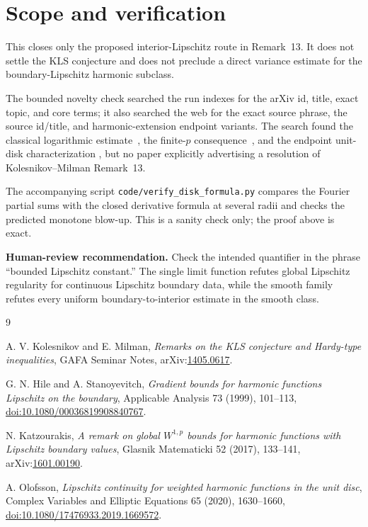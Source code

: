 \documentclass[11pt]{article}
\begin{document}
\section{Scope and verification}

This closes only the proposed interior-Lipschitz route in Remark~13.  It does
not settle the KLS conjecture and does not preclude a direct variance estimate
for the boundary-Lipschitz harmonic subclass.

The bounded novelty check searched the run indexes for the arXiv id, title,
exact topic, and core terms; it also searched the web for the exact source
phrase, the source id/title, and harmonic-extension endpoint variants.  The
search found the classical logarithmic estimate~\cite{HS}, the finite-\(p\)
consequence~\cite{Katz}, and the endpoint unit-disk characterization
\cite{Olofsson}, but no paper explicitly advertising a resolution of
Kolesnikov--Milman Remark~13.

The accompanying script \texttt{code/verify\_disk\_formula.py} compares the
Fourier partial sums with the closed derivative formula at several radii and
checks the predicted monotone blow-up.  This is a sanity check only; the proof
above is exact.

\textbf{Human-review recommendation.}  Check the intended quantifier in the
phrase ``bounded Lipschitz constant.''  The single limit function refutes
global Lipschitz regularity for continuous Lipschitz boundary data, while the
smooth family refutes every uniform boundary-to-interior estimate in the
smooth class.

\begin{thebibliography}{9}

A. V. Kolesnikov and E. Milman,
\emph{Remarks on the KLS conjecture and Hardy-type inequalities},
GAFA Seminar Notes, arXiv:\href{https://arxiv.org/abs/1405.0617}{1405.0617}.

G. N. Hile and A. Stanoyevitch,
\emph{Gradient bounds for harmonic functions Lipschitz on the boundary},
Applicable Analysis 73 (1999), 101--113,
\href{https://doi.org/10.1080/00036819908840767}{doi:10.1080/00036819908840767}.

N. Katzourakis,
\emph{A remark on global \(W^{1,p}\) bounds for harmonic functions with
Lipschitz boundary values},
Glasnik Matematicki 52 (2017), 133--141,
arXiv:\href{https://arxiv.org/abs/1601.00190}{1601.00190}.

A. Olofsson,
\emph{Lipschitz continuity for weighted harmonic functions in the unit disc},
Complex Variables and Elliptic Equations 65 (2020), 1630--1660,
\href{https://doi.org/10.1080/17476933.2019.1669572}{doi:10.1080/17476933.2019.1669572}.

\end{thebibliography}
\end{document}
